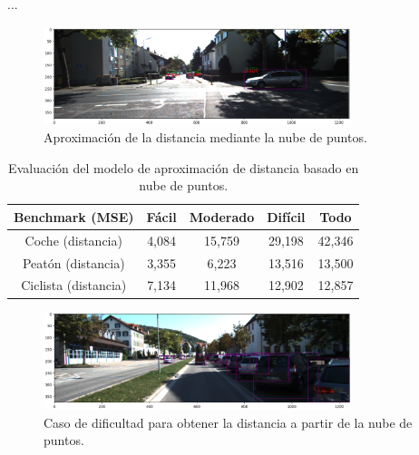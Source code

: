 ...

\begin{figure}[H]
    \centering
    \includegraphics[width=0.8\textwidth]{Book/figures/6_approx_distancia/pcl_projection_distance_kitti2.png}
    \caption{Aproximación de la distancia mediante la nube de puntos.}
    \label{fig:Aproximación de la distancia mediante la nube de puntos.}
\end{figure}

\begin{table}[H]
\centering
\begin{tabular}{|c|c|c|c|c|}
\hline
\textbf{Benchmark (MSE)} & \textbf{Fácil} & \textbf{Moderado} & \textbf{Difícil} & \textbf{Todo}\\ \hline \hline
Coche (distancia)        & 4,084          & 15,759             & 29,198   &42,346         \\ \hline
Peatón (distancia)       & 3,355          & 6,223             & 13,516    &13,500         \\ \hline
Ciclista (distancia)     & 7,134          & 11,968             & 12,902   &12,857        \\ \hline
\end{tabular}
\caption{Evaluación del modelo de aproximación de distancia basado en nube de puntos.}
\label{fig:Evaluación sobre KITTI del primer modelo de aproximación de distancia basado en nube de puntos.}
\end{table}

\begin{figure}[H]
    \centering
    \includegraphics[width=0.8\textwidth]{Book/figures/6_approx_distancia/bb2d_kitti2.png}
    \caption{Caso de dificultad para obtener la distancia a partir de la nube de puntos.}
    \label{fig:Caso de dificultad para obtener la distancia a partir de la nube de puntos.}
\end{figure}

